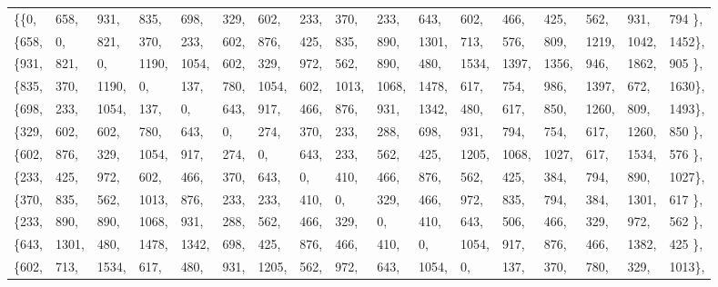 \documentclass[10pt,bezier]{article}
\begin{document}
\begin{table}[!htbp]	
{\tiny															
    \begin{tabular}{ l l l l l l l l l l l l l l l l l}	
            \{\{0,&   658,    &931,    &835,    &698,    &329,    &602,    &233,    &370,    &233,    &643,    &602,    &466,    &425,    &562,    &931,    &794 \}, \\
            \{658,&   0,      &821,    &370,    &233,    &602,    &876,    &425,    &835,    &890,    &1301,   &713,    &576,    &809,    &1219,   &1042,   &1452\}, \\
            \{931,&   821,    &0,      &1190,   &1054,   &602,    &329,    &972,    &562,    &890,    &480,    &1534,   &1397,   &1356,   &946,    &1862,   &905 \}, \\
            \{835,&   370,    &1190,   &0,      &137,    &780,    &1054,   &602,    &1013,   &1068,   &1478,   &617,    &754,    &986,    &1397,   &672,    &1630\}, \\
            \{698,&   233,    &1054,   &137,    &0,      &643,    &917,    &466,    &876,    &931,    &1342,   &480,    &617,    &850,    &1260,   &809,    &1493\}, \\
            \{329,&   602,    &602,    &780,    &643,    &0,      &274,    &370,    &233,    &288,    &698,    &931,    &794,    &754,    &617,    &1260,   &850 \}, \\
            \{602,&   876,    &329,    &1054,   &917,    &274,    &0,      &643,    &233,    &562,    &425,    &1205,   &1068,   &1027,   &617,    &1534,   &576 \}, \\
            \{233,&   425,    &972,    &602,    &466,    &370,    &643,    &0,      &410,    &466,    &876,    &562,    &425,    &384,    &794,    &890,    &1027\}, \\
            \{370,&   835,    &562,    &1013,   &876,    &233,    &233,    &410,    &0,      &329,    &466,    &972,    &835,    &794,    &384,    &1301,   &617 \}, \\
            \{233,&   890,    &890,    &1068,   &931,    &288,    &562,    &466,    &329,    &0,      &410,    &643,    &506,    &466,    &329,    &972,    &562 \}, \\
            \{643,&   1301,   &480,    &1478,   &1342,   &698,    &425,    &876,    &466,    &410,    &0,      &1054,   &917,    &876,    &466,    &1382,   &425 \}, \\
            \{602,&   713,    &1534,   &617,    &480,    &931,    &1205,   &562,    &972,    &643,    &1054,   &0,      &137,    &370,    &780,    &329,    &1013\}, \\

\end{tabular}}
\end{table}
\end{document}
